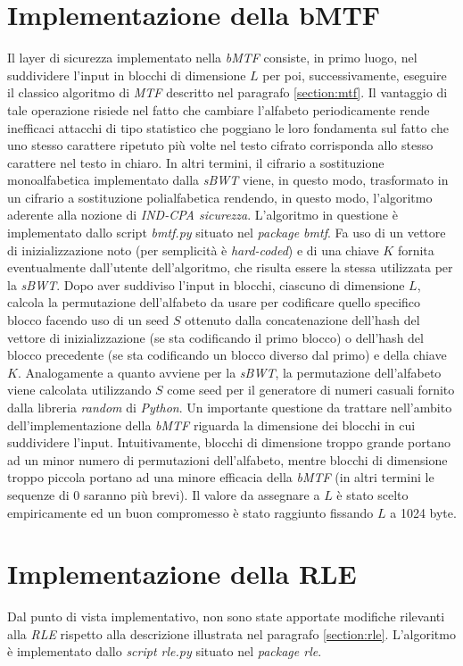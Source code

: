 \section{Implementazione della bMTF}
Il layer di sicurezza implementato nella \emph{bMTF} consiste, in primo luogo, nel suddividere l'input in blocchi di dimensione $L$ per poi, successivamente, eseguire il classico algoritmo di \emph{MTF} descritto nel paragrafo \ref{section:mtf}. Il vantaggio di tale operazione risiede nel fatto che cambiare l'alfabeto periodicamente rende inefficaci attacchi di tipo statistico che poggiano le loro fondamenta sul fatto che uno stesso carattere ripetuto più volte nel testo cifrato corrisponda allo stesso carattere nel testo in chiaro. In altri termini, il cifrario a sostituzione monoalfabetica implementato dalla \emph{sBWT} viene, in questo modo, trasformato in un cifrario a sostituzione polialfabetica rendendo, in questo modo, l'algoritmo aderente alla nozione di \emph{IND-CPA sicurezza}. L'algoritmo in questione è implementato dallo script \emph{bmtf.py} situato nel \emph{package bmtf}. Fa uso di un vettore di inizializzazione noto (per semplicità è \emph{hard-coded}) e di una chiave $K$ fornita eventualmente dall'utente dell'algoritmo, che risulta essere la stessa utilizzata per la \emph{sBWT}. Dopo aver suddiviso l'input in blocchi, ciascuno di dimensione $L$, calcola la permutazione dell'alfabeto da usare per codificare quello specifico blocco facendo uso di un seed $S$ ottenuto dalla concatenazione dell'hash del vettore di inizializzazione (se sta codificando il primo blocco) o dell'hash del blocco precedente (se sta codificando un blocco diverso dal primo) e della chiave $K$. Analogamente a quanto avviene per la \emph{sBWT}, la permutazione dell'alfabeto viene calcolata utilizzando $S$ come seed per il generatore di numeri casuali fornito dalla libreria \emph{random} di \emph{Python}. Un importante questione da trattare nell'ambito dell'implementazione della \emph{bMTF} riguarda la dimensione dei blocchi in cui suddividere l'input. Intuitivamente, blocchi di dimensione troppo grande portano ad un minor numero di permutazioni dell'alfabeto, mentre blocchi di dimensione troppo piccola portano ad una minore efficacia della \emph{bMTF} (in altri termini le sequenze di $0$ saranno più brevi). Il valore da assegnare a $L$ è stato scelto empiricamente ed un buon compromesso è stato raggiunto fissando $L$ a 1024 byte. 
\section{Implementazione della RLE} 
Dal punto di vista implementativo, non sono state apportate modifiche rilevanti alla \emph{RLE} rispetto alla descrizione illustrata nel paragrafo \ref{section:rle}. L'algoritmo è implementato dallo \emph{script rle.py} situato nel \emph{package rle}. 
